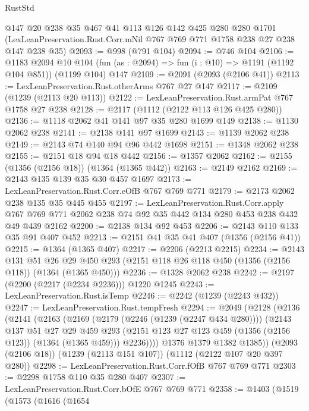 \begin{lexlean}{RustStd}
\begin{coremodule}
    @147
    @20
    @238
    @35
    @467
    @41
    @113
    @126
    @142
    @425
    @280
    @280
    @1701
    (LexLeanPreservation.Rust.Corr.mNil @767 @769 @771 @1758 @238 @27 @238 @147 @238 @35)
@2093 := @998 (@791 @104)
@2094 := @746 @104
@2106 := @1183
    @2094
    @10
    @104
    (fun (as : @2094) => fun (i : @10) => @1191 (@1192 @104 @851))
    (@1199 @104)
    @147
@2109 := @2091 (@2093 (@2106 @41))
@2113 := LexLeanPreservation.Rust.otherArms @767 @27 @147
@2117 := @2109 (@1239 (@2113 @20 @113))
@2122 := LexLeanPreservation.Rust.armPat @767 @1758 @27 @238
@2128 := @2117 (@1112 (@2122 @113 @126 @425 @280))
@2136 := @1118 @2062 @41 @141 @97 @35 @280 @1699 @149
@2138 := @1130 @2062 @238
@2141 := @2138 @141 @97 @1699
@2143 := @1139 @2062 @238
@2149 := @2143 @74 @140 @94 @96 @442 @1698
@2151 := @1348 @2062 @238
@2155 := @2151 @18 @94 @18 @442
@2156 := @1357 @2062
@2162 := @2155 (@1356 (@2156 @18)) (@1364 (@1365 @442))
@2163 := @2149 @2162
@2169 := @2143 @135 @139 @35 @30 @457 @1697
@2173 := LexLeanPreservation.Rust.Corr.eOfB @767 @769 @771
@2179 := @2173 @2062 @238 @135 @35 @445 @455
@2197 := LexLeanPreservation.Rust.Corr.apply
    @767
    @769
    @771
    @2062
    @238
    @74
    @92
    @35
    @442
    @134
    @280
    @453
    @238
    @432
    @49
    @439
    @2162
@2200 := @2138 @134 @92 @453
@2206 := @2143 @110 @133 @35 @91 @407 @452
@2213 := @2151 @41 @35 @41 @407 (@1356 (@2156 @41))
@2215 := @1364 (@1365 @407)
@2217 := @2206 (@2213 @2215)
@2234 := @2143
    @131
    @51
    @26
    @29
    @450
    @293
    (@2151 @118 @26 @118 @450 (@1356 (@2156 @118)) (@1364 (@1365 @450)))
@2236 := @1328 @2062 @238
@2242 := @2197 (@2200 (@2217 (@2234 @2236))) @1220 @1245
@2243 := LexLeanPreservation.Rust.isTemp
@2246 := @2242 (@1239 (@2243 @432))
@2247 := LexLeanPreservation.Rust.tempFresh
@2294 := @2049
    (@2128
      (@2136
        (@2141
          (@2163
            (@2169
              (@2179 (@2246 (@1239 (@2247 @434 @280))))
              (@2143
                @137
                @51
                @27
                @29
                @459
                @293
                (@2151 @123 @27 @123 @459 (@1356 (@2156 @123)) (@1364 (@1365 @459)))
                @2236))))
        @1376
        @1379
        @1382
        @1385))
    (@2093 (@2106 @18))
    (@1239 (@2113 @151 @107))
    (@1112 (@2122 @107 @20 @397 @280))
@2298 := LexLeanPreservation.Rust.Corr.fOfB @767 @769 @771
@2303 := @2298 @1758 @110 @35 @280 @407
@2307 := LexLeanPreservation.Rust.Corr.bOfE @767 @769 @771
@2358 := @1403
    (@1519
      (@1573
        (@1616
          (@1654

\end{coremodule}
\end{lexlean}
